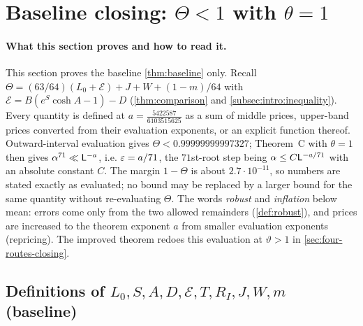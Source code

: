 \providecommand{\PushA}{\frac{5422587}{6103515625}}
\providecommand{\PushExponent}{\frac{5422587}{433349609375}}
\providecommand{\PushK}{890666}
\providecommand{\PushTheta}{0.99999999997327}
\section{Baseline closing: \texorpdfstring{$\Theta<1$}{Theta<1} with \texorpdfstring{$\theta=1$}{theta=1}}\label{sec:closing}

\paragraph{What this section proves and how to read it.}
This section proves the baseline \cref{thm:baseline} only. Recall
$\Theta=(63/64)(L_0+\mathcal E)+J+W+(1-m)/64$ with
$\mathcal E=B(e^S\cosh A-1)-D$ (\cref{thm:comparison} and
\cref{subsec:intro:inequality}). Every quantity is defined at
$a=\PushA$ as a sum of middle prices, upper-band prices converted
from their evaluation exponents, or an explicit function thereof.
Outward-interval evaluation gives $\Theta<\PushTheta$; Theorem~C
with $\theta=1$ then gives $\alpha^{71}\ll\mathsf L^{-a}$, i.e.
$\varepsilon=a/71$, the $71$st-root step being
$\alpha\le C\mathsf L^{-a/71}$ with an absolute constant $C$. The
margin $1-\Theta$ is about
$2.7\cdot10^{-11}$, so numbers are stated exactly as evaluated; no bound may be replaced by a larger bound for the same quantity without re-evaluating $\Theta$. The
words \emph{robust} and \emph{inflation} below mean: errors come
only from the two allowed remainders (\cref{def:robust}), and
prices are increased to the theorem exponent $a$ from smaller
evaluation exponents (repricing). The improved theorem redoes this
evaluation at $\vartheta>1$ in \cref{sec:four-routes-closing}.

\subsection{Definitions of \texorpdfstring{$L_0,S,A,D,\mathcal E,T,R_I,J,W,m$}{L\_0,S,A,D,E,T,R\_I,J,W,m} (baseline)}\label{subsec:closing-quantities}

